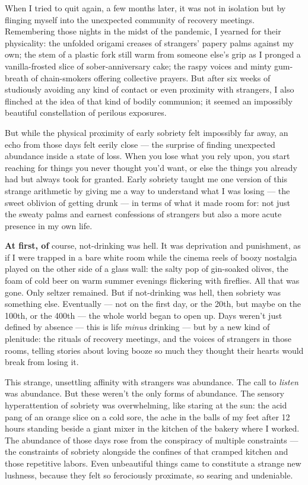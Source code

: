 When I tried to quit again, a few months later, it was not in isolation
but by flinging myself into the unexpected community of recovery
meetings. Remembering those nights in the midst of the pandemic, I
yearned for their physicality: the unfolded origami creases of
strangers' papery palms against my own; the stem of a plastic fork still
warm from someone else's grip as I pronged a vanilla-frosted slice of
sober-anniversary cake; the raspy voices and minty gum-breath of
chain-smokers offering collective prayers. But after six weeks of
studiously avoiding any kind of contact or even proximity with
strangers, I also flinched at the idea of that kind of bodily communion;
it seemed an impossibly beautiful constellation of perilous exposures.

But while the physical proximity of early sobriety felt impossibly far
away, an echo from those days felt eerily close --- the surprise of
finding unexpected abundance inside a state of loss. When you lose what
you rely upon, you start reaching for things you never thought you'd
want, or else the things you already had but always took for granted.
Early sobriety taught me one version of this strange arithmetic by
giving me a way to understand what I was losing --- the sweet oblivion
of getting drunk --- in terms of what it made room for: not just the
sweaty palms and earnest confessions of strangers but also a more acute
presence in my own life.

\textbf{At first, of} course, not-drinking was hell. It was deprivation
and punishment, as if I were trapped in a bare white room while the
cinema reels of boozy nostalgia played on the other side of a glass
wall: the salty pop of gin-soaked olives, the foam of cold beer on warm
summer evenings flickering with fireflies. All that was gone. Only
seltzer remained. But if not-drinking was hell, then sobriety was
something else. Eventually --- not on the first day, or the 20th, but
maybe on the 100th, or the 400th --- the whole world began to open up.
Days weren't just defined by absence --- this is life \emph{minus}
drinking --- but by a new kind of plenitude: the rituals of recovery
meetings, and the voices of strangers in those rooms, telling stories
about loving booze so much they thought their hearts would break from
losing it.

This strange, unsettling affinity with strangers was abundance. The call
to \emph{listen} was abundance. But these weren't the only forms of
abundance. The sensory hyperattention of sobriety was overwhelming, like
staring at the sun: the acid pang of an orange slice on a cold sore, the
ache in the balls of my feet after 12 hours standing beside a giant
mixer in the kitchen of the bakery where I worked. The abundance of
those days rose from the conspiracy of multiple constraints --- the
constraints of sobriety alongside the confines of that cramped kitchen
and those repetitive labors. Even unbeautiful things came to constitute
a strange new lushness, because they felt so ferociously proximate, so
searing and undeniable.


